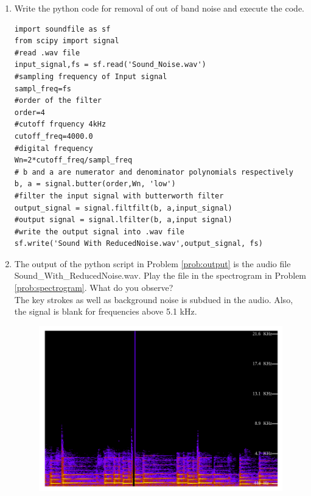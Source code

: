 \documentclass[journal,12pt,twocolumn]{IEEEtran}
\renewcommand\thesection{\arabic{section}}
\begin{document}
\begin{enumerate}[label=\thesection.\arabic*
,ref=\thesection.\theenumi]
\begin{figure}[!ht]
	\label{fig:xnyn}	
	\end{figure}
\item
\label{prob:output}
Write the python code for removal of out of band noise and execute the code.
\\
\solution
\begin{lstlisting}
import soundfile as sf
from scipy import signal
#read .wav file
input_signal,fs = sf.read('Sound_Noise.wav')
#sampling frequency of Input signal
sampl_freq=fs
#order of the filter
order=4
#cutoff frquency 4kHz
cutoff_freq=4000.0
#digital frequency
Wn=2*cutoff_freq/sampl_freq
# b and a are numerator and denominator polynomials respectively
b, a = signal.butter(order,Wn, 'low')
#filter the input signal with butterworth filter
output_signal = signal.filtfilt(b, a,input_signal)
#output signal = signal.lfilter(b, a,input signal)
#write the output signal into .wav file
sf.write('Sound With ReducedNoise.wav',output_signal, fs)
\end{lstlisting}
%
%
\item
The output of the python script in Problem \ref{prob:output} is the audio file Sound\_With\_ReducedNoise.wav. Play the file in the spectrogram in Problem \ref{prob:spectrogram}. What do you observe?
\\
\solution The key strokes as well as background noise is subdued in the audio.  Also,  the signal is blank for frequencies above 5.1 kHz.
\begin{figure}[!ht]
	\begin{center}
	\includegraphics[width=\columnwidth]{./figs/2_4}
	\end{center}
	\label{fig:xnyn}	
	\end{figure}
\end{enumerate}
\end{document}
